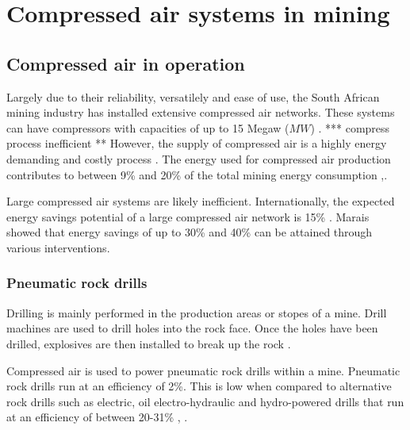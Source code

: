 \section{Compressed air systems in mining}
	\subsection{Compressed air in operation}\label{key}
		Largely due to their reliability, versatilely and ease of use, the South African mining industry has installed extensive compressed air networks. These systems can have compressors with capacities of up to 15 Mega\gls*{w} ($MW$) \cite{Marais2012PhD}. ***  compress process inefficient ** However, the supply of compressed air is a highly energy demanding and costly process \cite{padachi2009energy}.  The energy used for compressed air production contributes to between 9\% and 20\% of the total mining energy consumption	\cite{Eskom2010Energy},\cite{du2011development}. 
		\par
		Large compressed air systems are likely inefficient. Internationally, the expected energy savings potential of a large compressed air network is 15\% \cite{neale2009compressed}. Marais \cite{marais2013simplification} showed that energy savings of up to 30\% and 40\% can be attained through various interventions. 
		\subsubsection{Pneumatic rock drills}
	 		Drilling is mainly performed in the production areas or stopes of a mine. Drill machines are used to drill holes into the rock face. Once the holes have been drilled, explosives are then installed to break up the rock \cite{van2008development}.
	 		\par
	  		Compressed air is used to power pneumatic rock drills within a mine. Pneumatic rock drills run at an efficiency of 2\%. This is low when compared to alternative rock drills such as electric, oil electro-hydraulic and hydro-powered drills that run at an efficiency of between 20-31\% \cite{fraser2008saving}, \cite{vanTonder2010Masters}. 
